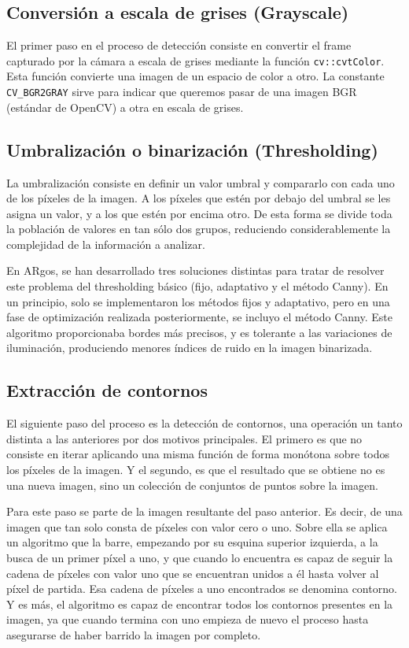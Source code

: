 \subsection{Conversión a escala de grises (Grayscale)}
El primer paso en el proceso de detección consiste en convertir el frame capturado por la cámara a
escala de grises mediante la función \texttt{cv::cvtColor}. Esta función convierte una imagen de un
espacio de color a otro. La constante \texttt{CV\_BGR2GRAY} sirve para indicar que queremos pasar de
una imagen BGR (estándar de OpenCV) a otra en escala de grises.

\subsection{Umbralización o binarización (Thresholding)}
La umbralización consiste en definir un valor umbral y compararlo con cada uno de los píxeles de la
imagen. A los píxeles que estén por debajo del umbral se les asigna un valor, y a los que estén por
encima otro. De esta forma se divide toda la población de valores en tan sólo dos grupos, reduciendo
considerablemente la complejidad de la información a analizar.

En ARgos, se han desarrollado tres soluciones distintas para tratar de resolver este problema del
thresholding básico (fijo, adaptativo y el método Canny). En un principio, solo se implementaron
los métodos fijos y adaptativo, pero en una fase de optimización realizada posteriormente, se incluyo
el método Canny. Este algoritmo proporcionaba bordes más precisos, y es  tolerante a las
variaciones de iluminación, produciendo menores índices de ruido en la imagen binarizada.

\subsection{Extracción de contornos}
El siguiente paso del proceso es la detección de contornos, una operación un tanto distinta a las
anteriores por dos motivos principales. El primero es que no consiste en iterar aplicando una misma
función de forma monótona sobre todos los píxeles de la imagen. Y el segundo, es que el resultado que
se obtiene no es una nueva imagen, sino un colección de conjuntos de puntos sobre la imagen.

Para este paso se parte de la imagen resultante del paso anterior. Es decir, de una imagen que tan
solo consta de píxeles con valor cero o uno. Sobre ella se aplica un algoritmo que la barre,
empezando por su esquina superior izquierda, a la busca de un primer píxel a uno, y que cuando lo
encuentra es capaz de seguir la cadena de píxeles con valor uno que se encuentran unidos a él hasta
volver al píxel de partida. Esa cadena de píxeles a uno encontrados se denomina contorno. Y es más,
el algoritmo es capaz de encontrar todos los contornos presentes en la imagen, ya que cuando termina
con uno empieza de nuevo el proceso hasta asegurarse de haber barrido la imagen por completo.

